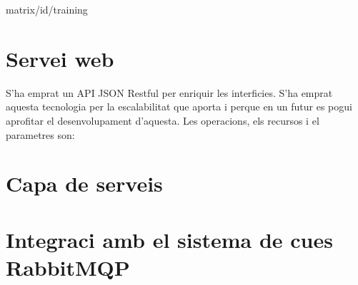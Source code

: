 matrix/{id}/training

\section{Servei web}
S'ha emprat un API JSON Restful per enriquir les interficies. S'ha emprat aquesta tecnologia per la escalabilitat que aporta i perque en un futur es pogui aprofitar el desenvolupament d'aquesta.
Les operacions, els recursos i el parametres son:

\section{Capa de serveis}

\section{Integraci amb el sistema de cues RabbitMQP}




